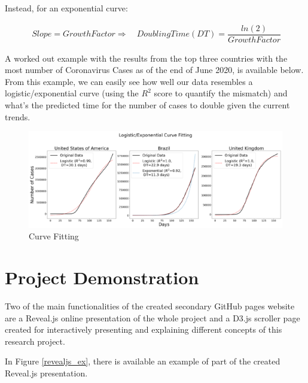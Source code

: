 \begin{appendices}
Instead, for an exponential curve:

\useshortskip
\begin{align}
\ Slope = Growth Factor \Rightarrow\quad Doubling Time (DT) = \dfrac{ln(2)}{Growth Factor}
\end{align}
\useshortskip

A worked out example with the results from the top three countries with the most number of Coronavirus Cases as of the end of June 2020, is available below. From this example, we can easily see how well our data resembles a logistic/exponential curve (using the $R^{2}$ score to quantify the mismatch) and what's the predicted time for the number of cases to double given the current trends.

\begin{figure}[ht!]%
    \centering
    \includegraphics[width=1\linewidth]{latex/images/fitting.pdf}
    \caption{Curve Fitting}
\end{figure}

\clearpage

\section{Project Demonstration}
\label{dem}

Two of the main functionalities of the created secondary GitHub pages website are a Reveal.js online presentation of the whole project and a D3.js scroller page created for interactively presenting and explaining different concepts of this research project.

In Figure \ref{revealjs_ex}, there is available an example of part of the created Reveal.js presentation.


\end{appendices}
